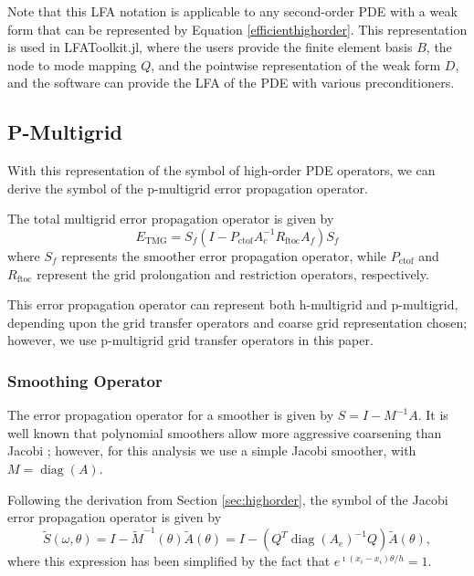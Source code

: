 \documentclass[review]{siamart190516}
\DeclareMathOperator{\diag}{diag}
\begin{document}
Note that this LFA notation is applicable to any second-order PDE with a weak form that can be represented by Equation \ref{efficienthighorder}.
This representation is used in LFAToolkit.jl, where the users provide the finite element basis $B$, the node to mode mapping $Q$, and the pointwise representation of the weak form $D$, and the software can provide the LFA of the PDE with various preconditioners.

\subsection{P-Multigrid}\label{sec:multigrid}

With this representation of the symbol of high-order PDE operators, we can derive the symbol of the p-multigrid error propagation operator.

The total multigrid error propagation operator is given by
\begin{equation}
E_{\text{TMG}} = S_f \left( I - P_{\text{ctof}} A_c^{-1} R_{\text{ftoc}} A_f \right) S_f
\end{equation}
where $S_f$ represents the smoother error propagation operator, while $P_{\text{ctof}}$ and $R_{\text{ftoc}}$ represent the grid prolongation and restriction operators, respectively.

This error propagation operator can represent both h-multigrid and p-multigrid, depending upon the grid transfer operators and coarse grid representation chosen; however, we use p-multigrid grid transfer operators in this paper.

\subsubsection{Smoothing Operator}\label{sec:smooth}

The error propagation operator for a smoother is given by $S = I - M^{-1} A$.
It is well known that polynomial smoothers allow more aggressive coarsening than Jacobi \cite{brannick2015polynomial};
however, for this analysis we use a simple Jacobi smoother, with $M = \diag \left( A \right)$.

Following the derivation from Section \ref{sec:highorder}, the symbol of the Jacobi error propagation operator is given by
\begin{equation}
\tilde{S} \left( \omega, \theta \right) = I - \tilde{M}^{-1} \left( \theta \right) \tilde{A} \left( \theta \right) = I - \left( Q^T \diag \left( A_e \right)^{-1} Q \right) \tilde{A} \left( \theta \right),
\end{equation}
where this expression has been simplified by the fact that $e^{\imath \left( x_i - x_i \right) \theta / h} = 1$.
\end{document}
